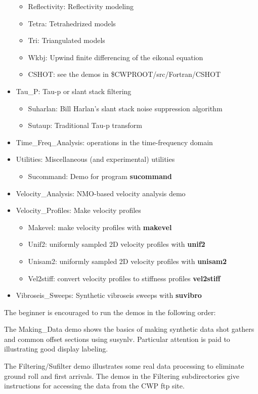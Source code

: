 \begin{itemize}
\begin{itemize}
	\item Reflectivity:  Reflectivity modeling
	\item Tetra:  Tetrahedrized models
	\item Tri: Triangulated models
	\item Wkbj: Upwind finite differencing of the eikonal equation
	\item CSHOT:  see the demos in \$CWPROOT/src/Fortran/CSHOT
	\end{itemize}
\item Tau\_P:  Tau-p or slant stack filtering
	\begin{itemize}
	\item Suharlan:  Bill Harlan's slant stack noise suppression algorithm
	\item Sutaup: Traditional Tau-p transform
	\end{itemize}
\item Time\_Freq\_Analysis:  operations in the time-frequency domain
\item Utilities: Miscellaneous (and experimental) utilities
	\begin{itemize}
	\item Sucommand:   Demo for program {\bf sucommand\/}
	\end{itemize}
\item Velocity\_Analysis: NMO-based velocity analysis demo
\item Velocity\_Profiles: Make velocity profiles
	\begin{itemize}
	\item Makevel:  make velocity profiles with {\bf makevel\/}
	\item Unif2:  uniformly sampled 2D velocity profiles with {\bf unif2\/}
	\item Unisam2: uniformly sampled 2D velocity profiles with {\bf unisam2\/}
	\item Vel2stiff:  convert velocity profiles to stiffness profiles {\bf vel2stiff}
	\end{itemize}
\item Vibroseis\_Sweeps: Synthetic vibroseis sweeps with {\bf suvibro}
\end{itemize}

The beginner is encouraged to run the demos in the following order:

The Making\_Data demo shows the basics of making synthetic data
shot gathers and common offset sections using susynlv.  Particular
attention is paid to illustrating good display labeling.

The Filtering/Sufilter demo illustrates some real data processing to
eliminate ground roll and first arrivals.  The demos in the
Filtering subdirectories give instructions for accessing the data
from the CWP ftp site.


